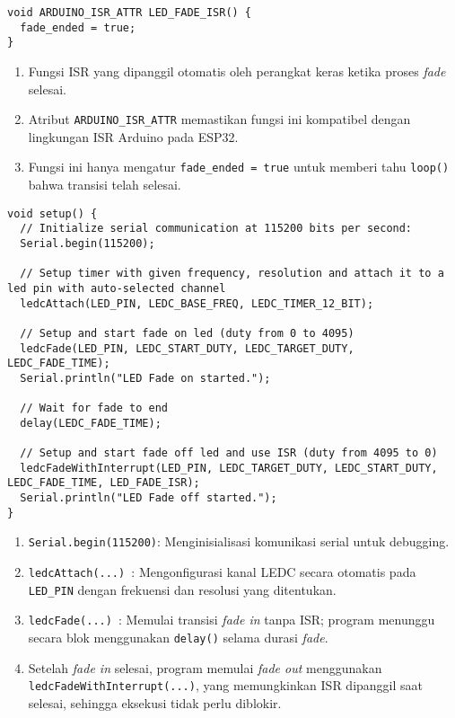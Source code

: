 \begin{verbatim}
void ARDUINO_ISR_ATTR LED_FADE_ISR() {
  fade_ended = true;
}
\end{verbatim}
\begin{enumerate}
    \item Fungsi ISR yang dipanggil otomatis oleh perangkat keras ketika proses \textit{fade} selesai.
    \item Atribut \texttt{ARDUINO\_ISR\_ATTR} memastikan fungsi ini kompatibel dengan lingkungan ISR Arduino pada ESP32.
    \item Fungsi ini hanya mengatur \texttt{fade\_ended = true} untuk memberi tahu \texttt{loop()} bahwa transisi telah selesai.
\end{enumerate}

\begin{verbatim}
void setup() {
  // Initialize serial communication at 115200 bits per second:
  Serial.begin(115200);

  // Setup timer with given frequency, resolution and attach it to a led pin with auto-selected channel
  ledcAttach(LED_PIN, LEDC_BASE_FREQ, LEDC_TIMER_12_BIT);

  // Setup and start fade on led (duty from 0 to 4095)
  ledcFade(LED_PIN, LEDC_START_DUTY, LEDC_TARGET_DUTY, LEDC_FADE_TIME);
  Serial.println("LED Fade on started.");

  // Wait for fade to end
  delay(LEDC_FADE_TIME);

  // Setup and start fade off led and use ISR (duty from 4095 to 0)
  ledcFadeWithInterrupt(LED_PIN, LEDC_TARGET_DUTY, LEDC_START_DUTY, LEDC_FADE_TIME, LED_FADE_ISR);
  Serial.println("LED Fade off started.");
}
\end{verbatim}
\begin{enumerate}
    \item \texttt{Serial.begin(115200)}: Menginisialisasi komunikasi serial untuk debugging.
    \item \texttt{ledcAttach(...) }: Mengonfigurasi kanal LEDC secara otomatis pada \texttt{LED\_PIN} dengan frekuensi dan resolusi yang ditentukan.
    \item \texttt{ledcFade(...) }: Memulai transisi \textit{fade in} tanpa ISR; program menunggu secara blok menggunakan \texttt{delay()} selama durasi \textit{fade}.
    \item Setelah \textit{fade in} selesai, program memulai \textit{fade out} menggunakan \texttt{ledcFadeWithInterrupt(...)}, yang memungkinkan ISR dipanggil saat selesai, sehingga eksekusi tidak perlu diblokir.
\end{enumerate}




